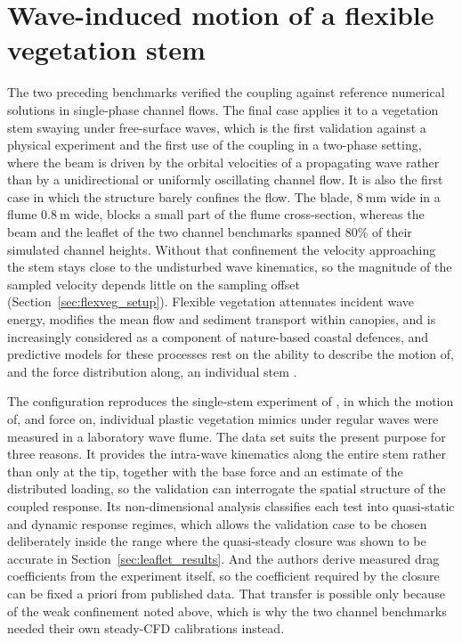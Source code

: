 \section{Wave-induced motion of a flexible vegetation stem}
\label{sec:flexveg}

\noindent
The two preceding benchmarks verified the coupling against reference numerical solutions in single-phase channel flows. The final case applies it to a vegetation stem swaying under free-surface waves, which is the first validation against a physical experiment and the first use of the coupling in a two-phase setting, where the beam is driven by the orbital velocities of a propagating wave rather than by a unidirectional or uniformly oscillating channel flow. It is also the first case in which the structure barely confines the flow. The blade, $8~\mathrm{mm}$ wide in a flume $0.8~\mathrm{m}$ wide, blocks a small part of the flume cross-section, whereas the beam and the leaflet of the two channel benchmarks spanned $80\%$ of their simulated channel heights. Without that confinement the velocity approaching the stem stays close to the undisturbed wave kinematics, so the magnitude of the sampled velocity depends little on the sampling offset (Section~\ref{sec:flexveg_setup}). Flexible vegetation attenuates incident wave energy, modifies the mean flow and sediment transport within canopies, and is increasingly considered as a component of nature-based coastal defences, and predictive models for these processes rest on the ability to describe the motion of, and the force distribution along, an individual stem \citep{luhar_waveinduced_2016,jacobsen_waveinduced_2019}.

\noindent
The configuration reproduces the single-stem experiment of \citet{jacobsen_waveinduced_2019}, in which the motion of, and force on, individual plastic vegetation mimics under regular waves were measured in a laboratory wave flume. The data set suits the present purpose for three reasons. It provides the intra-wave kinematics along the entire stem rather than only at the tip, together with the base force and an estimate of the distributed loading, so the validation can interrogate the spatial structure of the coupled response. Its non-dimensional analysis classifies each test into quasi-static and dynamic response regimes, which allows the validation case to be chosen deliberately inside the range where the quasi-steady closure was shown to be accurate in Section~\ref{sec:leaflet_results}. And the authors derive measured drag coefficients from the experiment itself, so the coefficient required by the closure can be fixed a priori from published data. That transfer is possible only because of the weak confinement noted above, which is why the two channel benchmarks needed their own steady-CFD calibrations instead.


